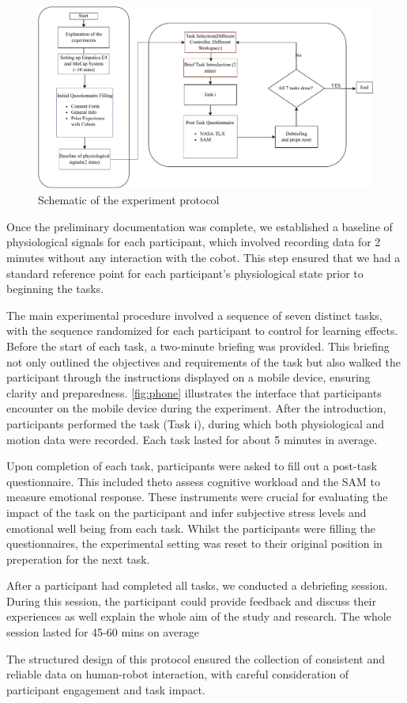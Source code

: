 \begin{figure}[h]
	\centering
	\includegraphics[width=\columnwidth]{images/expschematic.pdf}
	\caption{Schematic of the experiment protocol}
	\label{fig:prot}
\end{figure}

Once the preliminary documentation was complete, we established a baseline of physiological signals for each participant, which involved recording data for 2 minutes without any interaction with the cobot. This step ensured that we had a standard reference point for each participant's physiological state prior to beginning the tasks.

The main experimental procedure involved a sequence of seven distinct tasks, with the sequence randomized for each participant to control for learning effects.
Before the start of each task, a two-minute briefing was provided. This briefing not only outlined the objectives and requirements of the task but also walked the participant through the instructions displayed on a mobile device, ensuring clarity and preparedness. \autoref{fig:phone} illustrates the interface that participants encounter on the mobile device during the experiment. After the introduction, participants performed the task (Task i), during which both physiological and motion data were recorded. Each task lasted for about 5 minutes in average.



Upon completion of each task, participants were asked to fill out a post-task questionnaire. This included theto assess cognitive workload and the \gls{SAM} to measure emotional response. These instruments were crucial for evaluating the impact of the task on the participant and infer subjective stress levels and emotional well being from each task. Whilst the participants were filling the questionnaires, the experimental setting was reset to their original position in preperation for the next task.

 After a participant had completed all tasks, we conducted a debriefing session. During this session, the participant could provide feedback and discuss their experiences as well explain the whole aim of the study and research. The whole session lasted for 45-60 mins on average 

The structured design of this protocol ensured the collection of consistent and reliable data on human-robot interaction, with careful consideration of participant engagement and task impact.